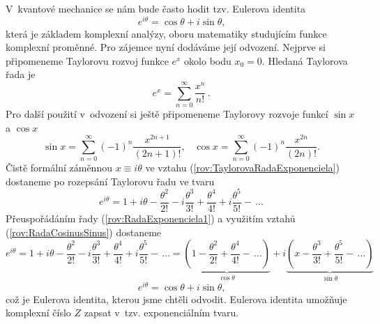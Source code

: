 V~kvantové mechanice se nám bude často hodit tzv. Eulerova identita
\begin{equation}
\boxed{e^{i \theta} = \cos \theta + i \sin \theta \mbox{,}}
\label{rov:EulerovaIdentita}
\end{equation}
která je základem komplexní analýzy, oboru matematiky studujícím funkce komplexní proměnné. Pro zájemce nyní dodáváme její odvození. Nejprve si připomeneme Taylorovu rozvoj funkce $e^{x}$ okolo bodu $x_0 = 0$. Hledaná Taylorova řada je
\begin{equation}
e^x = \sum_{n=0}^{\infty} \frac{x^n}{n!} \,\mbox{.}
\label{rov:TaylorovaRadaExponenciela}
\end{equation}
Pro další použití v~odvození si ještě připomeneme Taylorovy rozvoje funkcí $\sin x$ a $\cos x$
\begin{equation}
\sin x = \sum_{n=0}^{\infty} (-1)^{n} \frac{x^{2n+1}}{(2n+1)!} \mbox{,} \quad \cos x = \sum_{n=0}^{\infty} (-1)^{n} \frac{x^{2n}}{(2n)!} \mbox{.}
\label{rov:RadaCosinusSinus}
\end{equation}
Čistě formální záměnnou $x \equiv i \theta$ ve vztahu (\ref{rov:TaylorovaRadaExponenciela}) dostaneme po rozepsání Taylorovu řadu ve tvaru
\begin{equation}
e^{i\theta} = 1 + i\theta - \frac{\theta^2}{2!} - i \frac{\theta^3}{3!} + \frac{\theta^4}{4!} + i \frac{\theta^5}{5!} -\,\dots
\label{rov:RadaExponenciela1}
\end{equation}
Přeuspořádáním řady (\ref{rov:RadaExponenciela1}) a využitím vztahů (\ref{rov:RadaCosinusSinus}) dostaneme
\newpage
\begin{displaymath}
e^{i\theta} = 1 + i\theta - \frac{\theta^2}{2!} - i \frac{\theta^3}{3!} + \frac{\theta^4}{4!} + i \frac{\theta^5}{5!} -\,\dots =\underbrace{\left(1 - \frac{\theta^2}{2!} + \frac{\theta^4}{4!} - \,\dots \right)}_{\cos \theta} + i \underbrace{\left(x - \frac{\theta^3}{3!} + \frac{\theta^5}{5!} - \,\dots \right)}_{\sin \theta}
\end{displaymath}
\begin{equation}
e^{i\theta} = \cos \theta + i\sin \theta \mbox{,}
\label{rov:DukazEulerovaIdentita}
\end{equation}
což je Eulerova identita, kterou jsme chtěli odvodit. Eulerova identita umožňuje komplexní číslo $Z$ zapsat v~tzv. exponenciálním tvaru.


